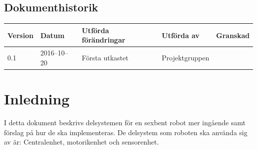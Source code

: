 \documentclass[a4paper,titlepage,12pt]{article}
\begin{document}
\begin{center}

		\section*{Dokumenthistorik}
		\renewcommand*{\arraystretch}{1.4}
		\begin{longtable}[c]{ l l l l l }
			\textbf{Version} & \textbf{Datum} & \textbf{Utförda förändringar} 
			& \textbf{Utförda av} & \textbf{Granskad} \\ \midrule
			
			0.1 & 2016--10--20 & Första utkastet & Projektgruppen & \\
		\end{longtable}
	\end{center}


	\newpage

	\section{Inledning}
	I detta dokument beskrivs delsystemen för en sexbent robot mer ingående samt förslag på hur de ska 
	implementeras. De delsystem som roboten ska använda sig av är:
	Centralenhet, motorikenhet och sensorenhet.

\end{document}

